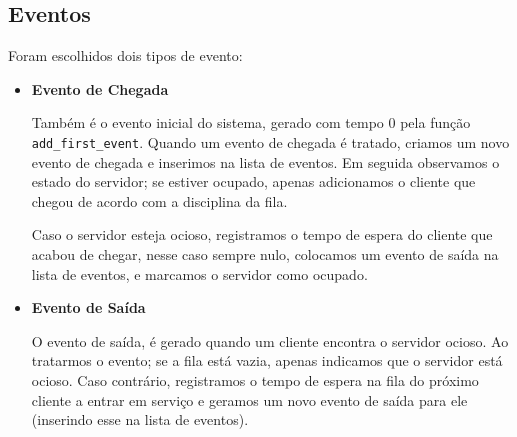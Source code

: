 \documentclass[a4paper]{article}
\newcommand{\inlcode}{\texttt}
\begin{document}
\subsection{Eventos}
Foram escolhidos dois tipos de evento:
\begin{itemize}
    \item \textbf{Evento de Chegada} \par
        Também é o evento inicial do sistema,
        gerado com tempo \(0\)
        pela função \inlcode{add\_first\_event}.
        Quando um evento de chegada é tratado,
        criamos um novo evento de chegada
        e inserimos na lista de eventos.
        Em seguida observamos o estado do servidor;
        se estiver ocupado, apenas
        adicionamos o cliente que chegou
        de acordo com a disciplina da fila.

        Caso o servidor esteja ocioso,
        registramos o tempo de espera
        do cliente que acabou de chegar,
        nesse caso sempre nulo,
        colocamos um evento de saída na lista de eventos,
        e marcamos o servidor como ocupado.

    \item \textbf{Evento de Saída} \par
        O evento de saída,
        é gerado quando um cliente encontra o servidor ocioso.
        Ao tratarmos o evento;
        se a fila está vazia,
        apenas indicamos que o servidor está ocioso.
        Caso contrário,
        registramos o tempo de espera na fila
        do próximo cliente a entrar em serviço
        e geramos um novo evento de saída para ele
        (inserindo esse na lista de eventos).
\end{itemize}
\end{document}
